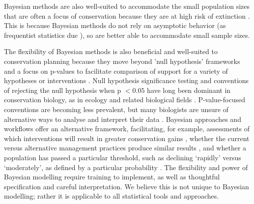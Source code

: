 \documentclass{article}
\begin{document}
Bayesian methods are also well-suited to accommodate the small population sizes that are often a focus of conservation because they are at high risk of extinction \citep{stinchcombe2002influence}. This is because Bayesian methods do not rely on asymptotic behavior (as frequentist statistics due \citep{mcneish2016using}), so are better able to accommodate small sample sizes.
\par The flexibility of Bayesian methods is also beneficial and well-suited to conservation planning because they move beyond 'null hypothesis' frameworks and a focus on p-values to facilitate comparison of support for a variety of hypotheses or interventions \citep{Zyl2018}. Null hypothesis significance testing and conventions of rejecting the null hypothesis when p $<0.05$ have long been dominant in conservation biology, as in ecology and related biological fields \citep[e.g., ecotoxicaology][]{erickson2020moving}. P-value-focused conventions are becoming less prevalent, but many biologists are unsure of alternative ways to analyse and interpret their data \citep{halsey2019reign}. Bayesian approaches and workflows offer an alternative framework, facilitating, for example, assessments of which interventions will result in greater conservation gains \citep{prato2005bayesian}, whether the current versus alternative management practices produce similar results \citep{gallistel2009importance}, and whether a population has passed a particular threshold, such as declining `rapidly' versus `moderately', as defined by a particular probability \citep{brooks2008quantifying}. The flexibility and power of Bayesian modelling require training to implement, as well as thoughtful specification and careful interpretation. We believe this is not unique to Bayesian modelling; rather it is applicable to all statistical tools and approaches.

\end{document}
